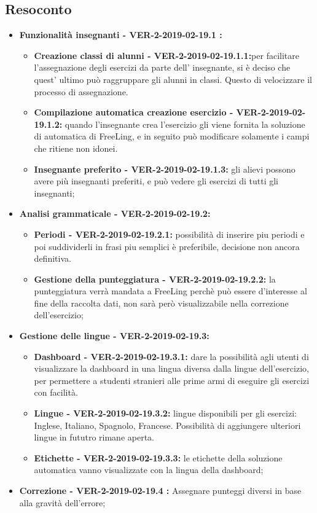 \documentclass[a4paper, oneside, openany, dvipsnames, table]{article}
\begin{document}
\subsection{Resoconto}
\begin{itemize}
	\item \textbf{Funzionalità insegnanti - VER-2-2019-02-19.1 :} 
	\begin{itemize}
		\item \textbf{Creazione classi di alunni - VER-2-2019-02-19.1.1:}per facilitare l'assegnazione degli esercizi da parte dell' insegnante,
		 si è deciso che quest' ultimo può raggruppare gli alunni in classi. Questo di velocizzare
		il processo di assegnazione.
		\item \textbf{Compilazione automatica creazione esercizio - VER-2-2019-02-19.1.2:}
		quando l'insegnante crea l'esercizio gli viene fornita la soluzione di automatica di FreeLing,
		e in seguito può modificare solamente i campi che ritiene non idonei.
		\item \textbf{Insegnante preferito - VER-2-2019-02-19.1.3:} 
		gli alievi possono avere più insegnanti preferiti, e può vedere gli esercizi di tutti gli insegnanti;
	\end{itemize}
	\item \textbf{Analisi grammaticale - VER-2-2019-02-19.2:}
	\begin{itemize}
		\item \textbf{Periodi - VER-2-2019-02-19.2.1:} possibilità di inserire piu periodi e poi suddividerli in frasi piu semplici è preferibile, decisione non ancora definitiva.
		\item \textbf{Gestione della punteggiatura - VER-2-2019-02-19.2.2:} la punteggiatura verrà mandata a FreeLing perchè 
		può essere d'interesse al fine della raccolta dati, non sarà però visualizzabile nella correzione dell'esercizio;
	\end{itemize}
	\item \textbf{Gestione delle lingue - VER-2-2019-02-19.3:} 
	\begin{itemize}
		\item \textbf{Dashboard - VER-2-2019-02-19.3.1:} dare la possibilità agli utenti di visualizzare la dashboard in una lingua diversa dalla lingue dell'esercizio,
		per permettere a studenti stranieri alle prime armi di eseguire gli esercizi con facilità.
		\item \textbf{Lingue - VER-2-2019-02-19.3.2:} lingue disponibili per gli esercizi: 
		Inglese, Italiano, Spagnolo, Francese. Possibilità di aggiungere ulteriori lingue in fututro rimane aperta.
		\item \textbf{Etichette - VER-2-2019-02-19.3.3:} le etichette della soluzione automatica
		vanno visualizzate con la lingua della dashboard;
	\end{itemize}
	\item \textbf{Correzione - VER-2-2019-02-19.4 :} 
	Assegnare punteggi diversi in base alla gravità dell'errore;
	

\end{itemize}
\end{document}
